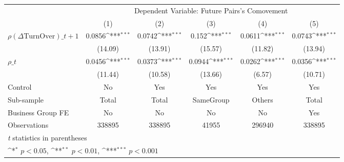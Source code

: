 {
\def\sym#1{\ifmmode^{#1}\else\(^{#1}\)\fi}
\begin{tabular}{l*{5}{c}}
\hline\hline
                    &\multicolumn{5}{c}{Dependent Variable:  Future Pairs's Comovement}                                           \\\cmidrule(lr){2-6}
                    &\multicolumn{1}{c}{(1)}         &\multicolumn{1}{c}{(2)}         &\multicolumn{1}{c}{(3)}         &\multicolumn{1}{c}{(4)}         &\multicolumn{1}{c}{(5)}         \\
\hline
 $ {\rho(\Delta \text{TurnOver})\_{t+1}} $ &      0.0856\sym{***}&      0.0742\sym{***}&       0.152\sym{***}&      0.0611\sym{***}&      0.0743\sym{***}\\
                    &     (14.09)         &     (13.91)         &     (15.57)         &     (11.82)         &     (13.94)         \\
[1em]
 $ {\rho\_t} $       &      0.0456\sym{***}&      0.0373\sym{***}&      0.0944\sym{***}&      0.0262\sym{***}&      0.0356\sym{***}\\
                    &     (11.44)         &     (10.58)         &     (13.66)         &      (6.57)         &     (10.71)         \\
\hline
Control             &          No         &         Yes         &         Yes         &         Yes         &         Yes         \\
Sub-sample          &       Total         &       Total         &   SameGroup         &      Others         &       Total         \\
Business Group FE   &          No         &          No         &          No         &          No         &         Yes         \\
Observations        &      338895         &      338895         &       41955         &      296940         &      338895         \\
\hline\hline
\multicolumn{6}{l}{\footnotesize \textit{t} statistics in parentheses}\\
\multicolumn{6}{l}{\footnotesize \sym{*} \(p<0.05\), \sym{**} \(p<0.01\), \sym{***} \(p<0.001\)}\\
\end{tabular}
}
